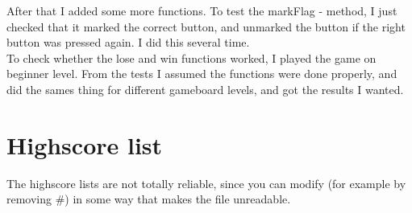 \documentclass[12pt,twoside,a4paper]{article}
\begin{document}
After that I added some more functions. To test the markFlag - method, I just checked that it marked the correct button, and unmarked the button if the right button was pressed again. I did this several time. \\

To check whether the lose and win functions worked, I played the game on beginner level. From the tests I assumed the functions were done properly, and did the sames thing for different gameboard levels, and got the results I wanted.

\section*{Highscore list}

The highscore lists are not totally reliable, since you can modify (for example by removing \#) in some way that makes the file unreadable. 
\end{document}

